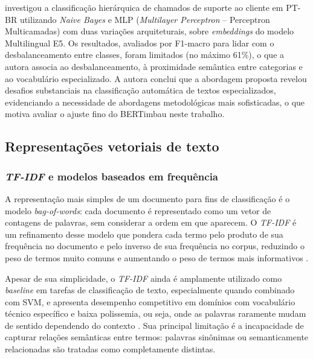 \documentclass[
    12pt,                %
    openright,           %
    oneside,             %
    a4paper,             %
    english,             %
    brazil               %
]{abntex2}
\begin{document}
 investigou a classificação hierárquica de 
chamados de suporte ao cliente em PT-BR utilizando \textit{Naive Bayes} e 
MLP (\textit{Multilayer Perceptron} -- Perceptron Multicamadas) com duas variações arquiteturais, 
sobre \textit{embeddings} do modelo Multilingual E5. Os resultados, 
avaliados por F1-macro para lidar com o desbalanceamento entre classes, 
foram limitados (no máximo 61\%), o que a autora associa ao desbalanceamento, 
à proximidade semântica entre categorias e ao vocabulário especializado.
A autora conclui que a abordagem proposta revelou desafios substanciais 
na classificação automática de textos especializados, evidenciando a 
necessidade de abordagens metodológicas mais sofisticadas, o que motiva 
avaliar o ajuste fino do BERTimbau neste trabalho.

\subsection{Representações vetoriais de texto}
\label{subsec:pln_representacoes}

\subsubsection{\textit{TF-IDF} e modelos baseados em frequência}
\label{subsubsec:pln_tfidf}

A representação mais simples de um documento para fins de classificação é o modelo \textit{bag-of-words}: cada documento é representado como um vetor de contagens de palavras, sem considerar a ordem em que aparecem. O \textit{TF-IDF} é um refinamento desse modelo que pondera cada termo pelo produto de sua frequência no documento e pelo inverso de sua frequência no corpus, reduzindo o peso de termos muito comuns e aumentando o peso de termos mais informativos \cite{razma2026}.

Apesar de sua simplicidade, o \textit{TF-IDF} ainda é amplamente utilizado como \textit{baseline} em tarefas de classificação de texto, especialmente quando combinado com SVM, e apresenta desempenho competitivo em domínios com vocabulário técnico específico e baixa polissemia, ou seja, onde as palavras raramente mudam de sentido dependendo do contexto \cite{wahba2023}. Sua principal limitação é a incapacidade de capturar relações semânticas entre termos: palavras sinônimas ou semanticamente relacionadas são tratadas como completamente distintas.
\end{document}
